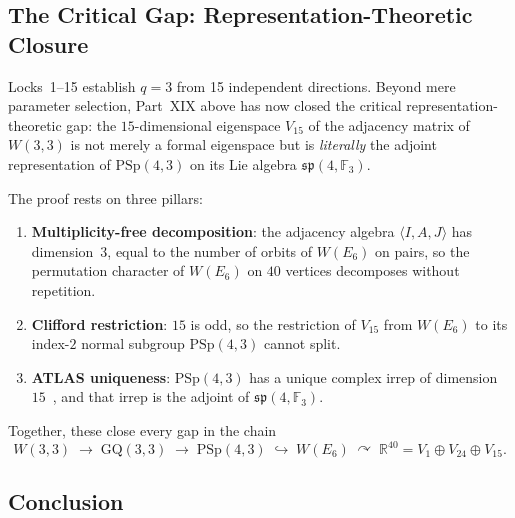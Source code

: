\subsection{The Critical Gap: Representation-Theoretic Closure}

Locks~1--15 establish $q = 3$ from 15 independent directions.  Beyond mere
parameter selection, Part~XIX above has now closed the critical
representation-theoretic gap: the $15$-dimensional eigenspace $V_{15}$ of the
adjacency matrix of $W(3,3)$ is not merely a formal eigenspace but is
\emph{literally} the adjoint representation of $\mathrm{PSp}(4,3)$ on its
Lie algebra $\mathfrak{sp}(4, \mathbb{F}_3)$.

The proof rests on three pillars:
\begin{enumerate}
  \item \textbf{Multiplicity-free decomposition}: the adjacency algebra
    $\langle I, A, J\rangle$ has dimension~$3$, equal to the number of orbits of
    $W(E_6)$ on pairs, so the permutation character of $W(E_6)$ on $40$ vertices
    decomposes without repetition.
  \item \textbf{Clifford restriction}: $15$ is odd, so the restriction of $V_{15}$
    from $W(E_6)$ to its index-$2$ normal subgroup $\mathrm{PSp}(4,3)$ cannot split.
  \item \textbf{ATLAS uniqueness}: $\mathrm{PSp}(4,3)$ has a unique complex irrep
    of dimension~$15$~\cite{ATLAS_part21}, and that irrep is the adjoint of
    $\mathfrak{sp}(4,\mathbb{F}_3)$.
\end{enumerate}

\noindent
Together, these close every gap in the chain
\[
  W(3,3) \;\longrightarrow\; \mathrm{GQ}(3,3) \;\longrightarrow\;
  \mathrm{PSp}(4,3) \;\hookrightarrow\; W(E_6)
  \;\curvearrowright\; \mathbb{R}^{40} = V_1 \oplus V_{24} \oplus V_{15}.
\]

\subsection{Conclusion}

\begin{center}
\end{center}

